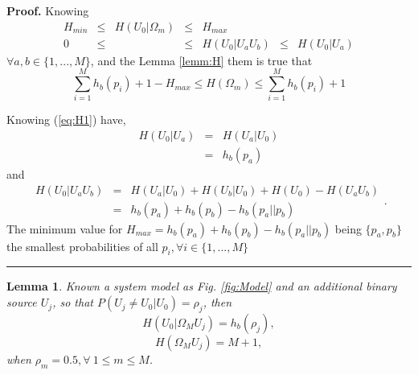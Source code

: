 \documentclass[a4paper,10pt]{article}
\newtheorem{mylemma}[mytheorem]{Lemma}
\newenvironment{myproof}[1][Proof]{\textbf{#1.} }{\ \rule{0.5em}{0.5em}}
\begin{document}
\begin{myproof}
 \label{proof:Hin}
 Knowing 
\begin{equation}\label{eq:Hin1}
\begin{matrix}
 H_{min} & \leq & H(U_0|\Omega_m) & \leq & H_{max}       & ~    & ~\\
 0       & \leq & ~               & \leq & H(U_0|U_aU_b) & \leq &H(U_0|U_a)
\end{matrix}
\end{equation}
$\forall a,b \in \{1, ..., M\}$, and the Lemma \ref{lemm:H} them is true that
\begin{equation}\label{eq:Hin2}
 \sum_{i=1}^{M}{h_{b}(p_i)}+1 -H_{max} \leq H(\Omega_m) \leq \sum_{i=1}^{M}{h_{b}(p_i)}+1
\end{equation}

 Knowing (\ref{eq:H1}) have,  
 \begin{equation}\label{eq:Hin4}
\begin{matrix}
 H(U_0|U_a)&=&H(U_a|U_0)\\
       ~  &=&h_{b}(p_a)
\end{matrix}
\end{equation}
and 
\begin{equation}\label{eq:Hin5}
\begin{matrix}
H(U_0|U_aU_b) & = & H(U_a|U_0) + H(U_b|U_0) + H(U_0)- H(U_aU_b)  \\
 ~            & = & h_{b}(p_a) + h_{b}(p_b) - h_{b}(p_a||p_b)
 \end{matrix}.
\end{equation}
The minimum value for $H_{max}=h_{b}(p_a) + h_{b}(p_b) - h_{b}(p_a||p_b)$ being 
$\{p_a,p_b\}$ the smallest probabilities of all $p_i, \forall i \in \{1, ..., M\}$ 
\end{myproof}

\begin{mdframed}[style=MDFStyGrayScreen]
\begin{mylemma}
 \label{lemm:h0OmegaM_1}
 Known a system model as Fig. \ref{fig:Model} and an additional binary source $U_j$, so that $P(U_j\neq U_0|U_0)=\rho_j$, then
\begin{equation}\label{eq:h0OmegaM_1_a}
H(U_0|\Omega_M U_j) = h_{b}(\rho_j),
\end{equation}
\begin{equation}\label{eq:h0OmegaM_1_a2}
H(\Omega_M U_j) = M+1,
\end{equation}
when $\rho_m=0.5, \forall~1 \leq m\leq M$.
\end{mylemma}
\end{mdframed}
\end{document}
